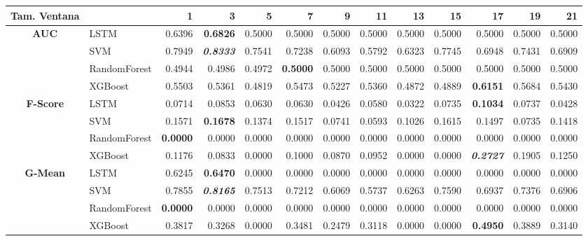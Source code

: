 \begin{table}[H]
	\centering
	\begin{adjustbox}{max width=14cm}
		\begin{tabular}{|c|l|r|r|r|r|r|r|r|r|r|r|r|}
			\hline
			\textbf{Tam. Ventana} &         &      1  &      3  &      5  &      7  &      9  &      11 &      13 &      15 &      17 &      19 &      21 \\
			\hline
			\textbf{AUC} &  LSTM &  0.6396 & \textbf{  0.6826 } &  0.5000 &  0.5000 &  0.5000 &  0.5000 &  0.5000 &  0.5000 &  0.5000 &  0.5000 &  0.5000 \\
			&  SVM &  0.7949 & \textit{ \textbf{  0.8333 } } &  0.7541 &  0.7238 &  0.6093 &  0.5792 &  0.6323 &  0.7745 &  0.6948 &  0.7431 &  0.6909 \\
			&  RandomForest &  0.4944 &  0.4986 &  0.4972 & \textbf{  0.5000 } &  0.5000 &  0.5000 &  0.5000 &  0.5000 &  0.5000 &  0.5000 &  0.5000 \\
			&  XGBoost &  0.5503 &  0.5361 &  0.4819 &  0.5473 &  0.5227 &  0.5360 &  0.4872 &  0.4889 & \textbf{  0.6151 } &  0.5684 &  0.5430 \\
			\hline
			\textbf{F-Score} &  LSTM &  0.0714 &  0.0853 &  0.0630 &  0.0630 &  0.0426 &  0.0580 &  0.0322 &  0.0735 & \textbf{  0.1034 } &  0.0737 &  0.0428 \\
			&  SVM &  0.1571 & \textbf{  0.1678 } &  0.1374 &  0.1517 &  0.0741 &  0.0593 &  0.1026 &  0.1615 &  0.1497 &  0.0735 &  0.1418 \\
			&  RandomForest & \textbf{  0.0000 } &  0.0000 &  0.0000 &  0.0000 &  0.0000 &  0.0000 &  0.0000 &  0.0000 &  0.0000 &  0.0000 &  0.0000 \\
			&  XGBoost &  0.1176 &  0.0833 &  0.0000 &  0.1000 &  0.0870 &  0.0952 &  0.0000 &  0.0000 & \textit{ \textbf{  0.2727 } } &  0.1905 &  0.1250 \\
			\hline
			\textbf{G-Mean} &  LSTM &  0.6245 & \textbf{  0.6470 } &  0.0000 &  0.0000 &  0.0000 &  0.0000 &  0.0000 &  0.0000 &  0.0000 &  0.0000 &  0.0000 \\
			&  SVM &  0.7855 & \textit{ \textbf{  0.8165 } } &  0.7513 &  0.7212 &  0.6069 &  0.5737 &  0.6263 &  0.7590 &  0.6937 &  0.7376 &  0.6906 \\
			&  RandomForest & \textbf{  0.0000 } &  0.0000 &  0.0000 &  0.0000 &  0.0000 &  0.0000 &  0.0000 &  0.0000 &  0.0000 &  0.0000 &  0.0000 \\
			&  XGBoost &  0.3817 &  0.3268 &  0.0000 &  0.3481 &  0.2479 &  0.3118 &  0.0000 &  0.0000 & \textbf{  0.4950 } &  0.3889 &  0.3140 \\

\end{tabular}
\end{adjustbox}
\end{table}
